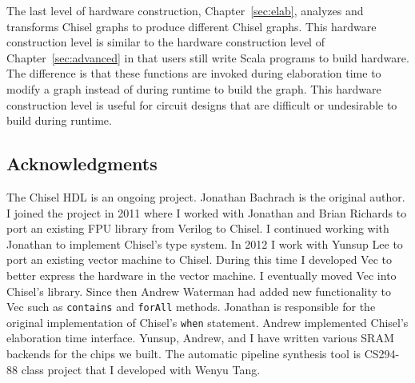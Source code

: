The last level of hardware construction, Chapter~\ref{sec:elab},
analyzes and transforms Chisel graphs to produce different Chisel
graphs. This hardware construction level is similar to the hardware
construction level of Chapter~\ref{sec:advanced} in that users still
write Scala programs to build hardware. The difference is that these
functions are invoked during elaboration time to modify a graph
instead of during runtime to build the graph. This hardware
construction level is useful for circuit designs that are difficult or
undesirable to build during runtime.

\subsection{Acknowledgments}
The Chisel HDL is an ongoing project. Jonathan Bachrach is the
original author. I joined the project in 2011 where I worked with
Jonathan and Brian Richards to port an existing FPU library from
Verilog to Chisel. I continued working with Jonathan to implement
Chisel's type system. In 2012 I work with Yunsup Lee to port an
existing vector machine to Chisel. During this time I developed Vec to
better express the hardware in the vector machine. I eventually moved
Vec into Chisel's library. Since then Andrew Waterman had added new
functionality to Vec such as {\tt contains} and {\tt forAll}
methods. Jonathan is responsible for the original implementation of
Chisel's {\tt when} statement. Andrew implemented Chisel's elaboration
time interface. Yunsup, Andrew, and I have written various SRAM
backends for the chips we built. The automatic pipeline synthesis tool
is CS294-88 class project that I developed with Wenyu Tang.
